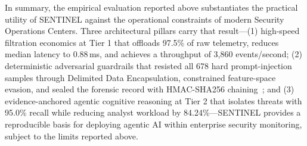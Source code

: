 In summary, the empirical evaluation reported above substantiates the practical utility of SENTINEL against the operational constraints of modern Security Operations Centers. Three architectural pillars carry that result---(1) high-speed filtration economics at Tier 1 that offloads 97.5\% of raw telemetry, reduces median latency to 0.88\,ms, and achieves a throughput of 3,860 events/second; (2) deterministic adversarial guardrails that resisted all 678 hard prompt-injection samples through Delimited Data Encapsulation, constrained feature-space evasion, and sealed the forensic record with HMAC-SHA256 chaining~\cite{hmac1997}; and (3) evidence-anchored agentic cognitive reasoning at Tier 2 that isolates threats with 95.0\% recall while reducing analyst workload by 84.24\%---SENTINEL provides a reproducible basis for deploying agentic AI within enterprise security monitoring, subject to the limits reported above.

